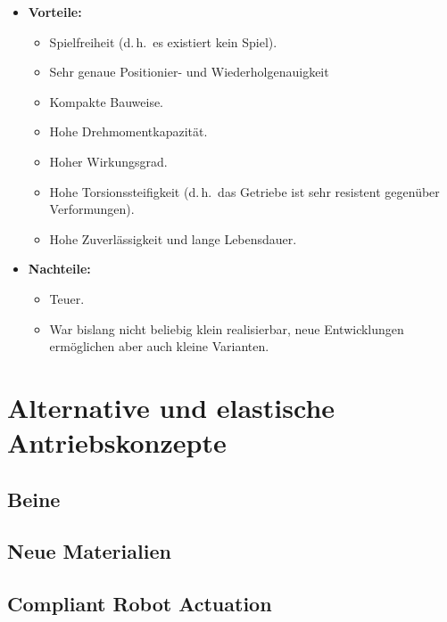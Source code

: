 \documentclass[a4paper, 11pt, accentcolor = tud3b]{tudreport}
\renewcommand{\dh}{d.\,h.~}
\begin{document}
					\begin{itemize}
						\item \textbf{Vorteile:}
							\begin{itemize}
								\item Spielfreiheit (\dh es existiert kein Spiel).
								\item Sehr genaue Positionier- und Wiederholgenauigkeit
								\item Kompakte Bauweise.
								\item Hohe Drehmomentkapazität.
								\item Hoher Wirkungsgrad.
								\item Hohe Torsionssteifigkeit (\dh das Getriebe ist sehr resistent gegenüber Verformungen).
								\item Hohe Zuverlässigkeit und lange Lebensdauer.
							\end{itemize}
						\item \textbf{Nachteile:}
							\begin{itemize}
								\item Teuer.
								\item War bislang nicht beliebig klein realisierbar, neue Entwicklungen ermöglichen aber auch kleine Varianten.
							\end{itemize}
					\end{itemize}

		\section{Alternative und elastische Antriebskonzepte} %

			\subsection{Beine} %

			\subsection{Neue Materialien} %

			\subsection{Compliant Robot Actuation} %
\end{document}
